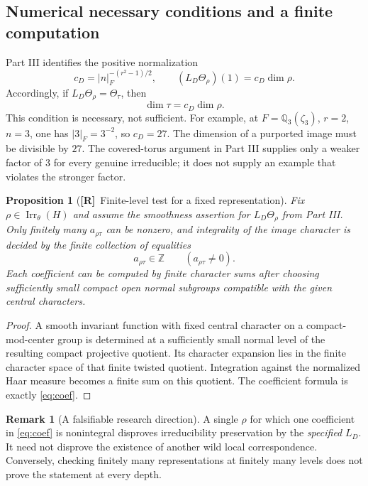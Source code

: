 \documentclass[11pt]{article}
\newcommand{\Z}{\mathbb Z}
\newcommand{\Irr}{\operatorname{Irr}}
\newcommand{\Rtag}{\textnormal{\textbf{[R]}}}
\theoremstyle{plain}
\newtheorem{proposition}[theorem]{Proposition}
\theoremstyle{definition}
\newtheorem{remark}[theorem]{Remark}
\begin{document}
\subsection{Numerical necessary conditions and a finite computation}\label{subsec:numerical}
Part III identifies the positive normalization
\begin{equation}\label{eq:cd}
 c_D=|n|_F^{-(r^2-1)/2},\qquad
 (L_D\Theta_\rho)(1)=c_D\dim\rho.
\end{equation}
Accordingly, if $L_D\Theta_\rho=\Theta_\tau$, then
\begin{equation}\label{eq:dim}
 \dim\tau=c_D\dim\rho.
\end{equation}
This condition is necessary, not sufficient.  For example, at
$F=\mathbb Q_3(\zeta_3)$, $r=2$, $n=3$, one has $|3|_F=3^{-2}$,
so $c_D=27$.  The dimension of a purported image must be divisible
by $27$.  The covered-torus argument in Part III supplies only a weaker
factor of $3$ for every genuine irreducible; it does not supply an
example that violates the stronger factor.

\begin{proposition}[\Rtag\ Finite-level test for a fixed representation]\label{prop:finite-test}
Fix $\rho\in\Irr_\theta(H)$ and assume the smoothness assertion for
$L_D\Theta_\rho$ from Part III.  Only finitely many
$a_{\rho\tau}$ can be nonzero, and integrality of the image character
is decided by the finite collection of equalities
\[
 a_{\rho\tau}\in\Z\qquad
 (a_{\rho\tau}\ne0).
\]
Each coefficient can be computed by finite character sums after
choosing sufficiently small compact open normal subgroups compatible
with the given central characters.
\end{proposition}
\begin{proof}
A smooth invariant function with fixed central character on a
compact-mod-center group is determined at a sufficiently small normal
level of the resulting compact projective quotient.  Its character expansion lies in the finite
character space of that finite twisted quotient.  Integration against
the normalized Haar measure becomes a finite sum on this quotient.
The coefficient formula is exactly \eqref{eq:coef}.
\end{proof}

\begin{remark}[A falsifiable research direction]\label{rem:counter}
A single $\rho$ for which one coefficient in \eqref{eq:coef} is
nonintegral disproves irreducibility preservation by the \emph{specified}
$L_D$.  It need not disprove the existence of another wild local
correspondence.  Conversely, checking finitely many representations
at finitely many levels does not prove the statement at every depth.
\end{remark}
\end{document}
